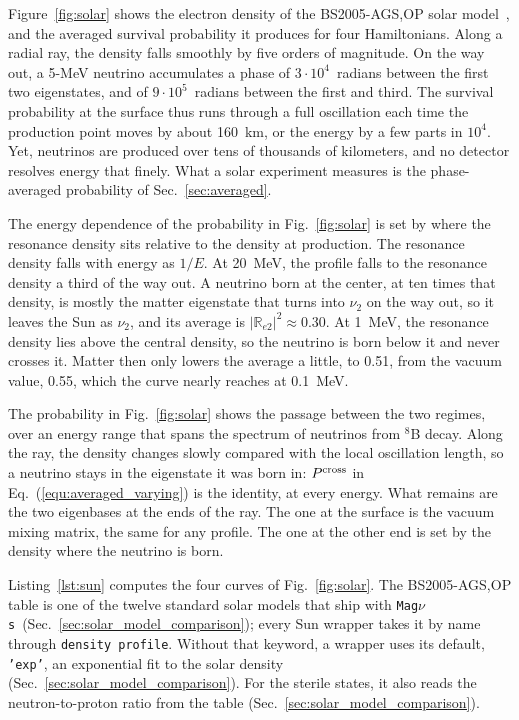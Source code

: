\documentclass[final,5p,times,twocolumn,sort,compress]{elsarticle}
\makeatletter
\newcommand{\eq}{Eq.}
\newcommand{\fig}{Fig.}
\DeclareRobustCommand{\_}{%
  \ifmmode\nfss@text{\textunderscore}\else\textunderscore\allowbreak\fi}
\newcommand{\equ}[1]{\eq~(\ref{equ:#1})}
\newcommand{\figu}[1]{\fig~\ref{fig:#1}}
\newcommand{\magnus}{{\tt Mag}\ensuremath{\nu}{\tt s}}
\makeatother
\begin{document}
Figure~\ref{fig:solar} shows the electron density of the BS2005-AGS,OP solar model\ \cite{Bahcall:2004pz}, and the averaged survival probability it produces for four Hamiltonians. Along a radial ray, the density falls smoothly by five orders of magnitude. On the way out, a 5-MeV neutrino accumulates a phase of $3 \cdot 10^4$~radians between the first two eigenstates, and of $9 \cdot 10^5$~radians between the first and third. The survival probability at the surface thus runs through a full oscillation each time the production point moves by about 160~km, or the energy by a few parts in $10^4$. Yet, neutrinos are produced over tens of thousands of kilometers, and no detector resolves energy that finely. What a solar experiment measures is the phase-averaged probability of Sec.~\ref{sec:averaged}.

The energy dependence of the probability in \figu{solar} is set by where the resonance density sits relative to the density at production. The resonance density falls with energy as $1/E$. At 20~MeV, the profile falls to the resonance density a third of the way out. A neutrino born at the center, at ten times that density, is mostly the matter eigenstate that turns into $\nu_2$ on the way out, so it leaves the Sun as $\nu_2$, and its average is $\lvert \mathbb{R}_{e2} \rvert^2 \approx 0.30$. At 1~MeV, the resonance density lies above the central density, so the neutrino is born below it and never crosses it. Matter then only lowers the average a little, to 0.51, from the vacuum value, 0.55, which the curve nearly reaches at 0.1~MeV.

The probability in \figu{solar} shows the passage between the two regimes, over an energy range that spans the spectrum of neutrinos from $^8$B decay. Along the ray, the density changes slowly compared with the local oscillation length, so a neutrino stays in the eigenstate it was born in: $P^{\rm cross}$ in \equ{averaged_varying} is the identity, at every energy. What remains are the two eigenbases at the ends of the ray. The one at the surface is the vacuum mixing matrix, the same for any profile. The one at the other end is set by the density where the neutrino is born.

Listing~\ref{lst:sun} computes the four curves of \figu{solar}. The BS2005-AGS,OP table is one of the twelve standard solar models that ship with \magnus\ (Sec.~\ref{sec:solar_model_comparison}); every Sun wrapper takes it by name through {\tt density\_profile}. Without that keyword, a wrapper uses its default, {\tt 'exp'}, an exponential fit to the solar density (Sec.~\ref{sec:solar_model_comparison}). For the sterile states, it also reads the neutron-to-proton ratio from the table (Sec.~\ref{sec:solar_model_comparison}). 
\end{document}
